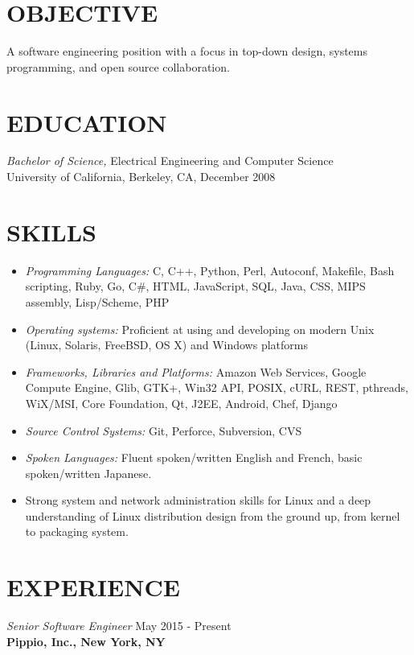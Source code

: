 \documentclass[overlapped,line,margin]{res}
\begin{document}
\address{2192 Frederick Douglass Blvd, Apt 2W, New York, NY 10026}
\address{(650) 906-2996}

\begin{resume}

\section{OBJECTIVE}
A software engineering position with a focus in top-down design,
systems programming, and open source collaboration.

\section{EDUCATION} {\sl Bachelor of Science,} Electrical Engineering and Computer Science \\
  University of California, Berkeley, CA, December 2008

\section{SKILLS}
\begin{itemize}
\item {\sl Programming Languages:}
  C, C++, Python, Perl, Autoconf, Makefile, Bash scripting, Ruby, Go, C\#, HTML,
  JavaScript, SQL, Java, CSS, MIPS assembly, Lisp/Scheme, PHP
\item {\sl Operating systems:}
  Proficient at using and developing on modern Unix (Linux,
  Solaris, FreeBSD, OS X) and Windows platforms
\item {\sl Frameworks, Libraries and Platforms:}
  Amazon Web Services, Google Compute Engine, Glib, GTK+, Win32 API, POSIX,
  cURL, REST, pthreads, WiX/MSI, Core Foundation, Qt, J2EE, Android, Chef,
  Django
\item {\sl Source Control Systems:}
  Git, Perforce, Subversion, CVS
\item {\sl Spoken Languages:}
  Fluent spoken/written English and French, basic spoken/written Japanese.
\item Strong system and network administration skills for Linux and a
  deep understanding of Linux distribution design from the ground up, from
  kernel to packaging system.
\end{itemize}

\section{EXPERIENCE}
{\sl Senior Software Engineer} \hfill May 2015 - Present \\
\textbf{Pippio, Inc., New York, NY}


\end{resume}
\end{document}
